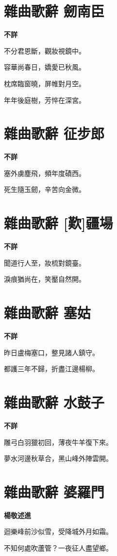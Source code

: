 \documentclass[12pt,a4paper]{ctexbook}
\begin{document}
\section{雜曲歌辭 劒南臣}
\textbf{不詳}\par\vspace{0.5em}
不分君恩斷，觀妝視鏡中。\par
容華尚春日，嬌愛已秋風。\par
枕席臨窗曉，屏帷對月空。\par
年年後庭樹，芳悴在深宮。\par

\section{雜曲歌辭 征步郎}
\textbf{不詳}\par\vspace{0.5em}
塞外虜塵飛，頻年度磧西。\par
死生隨玉劒，辛苦向金微。\par

\section{雜曲歌辭 [歎]疆場}
\textbf{不詳}\par\vspace{0.5em}
聞道行人至，妝梳對鏡臺。\par
淚痕猶尚在，笑靨自然開。\par

\section{雜曲歌辭 塞姑}
\textbf{不詳}\par\vspace{0.5em}
昨日盧梅塞口，整見諸人鎮守。\par
都護三年不歸，折盡江邊楊柳。\par

\section{雜曲歌辭 水鼓子}
\textbf{不詳}\par\vspace{0.5em}
雕弓白羽獵初回，薄夜牛羊復下來。\par
夢水河邊秋草合，黑山峰外陣雲開。\par

\section{雜曲歌辭 婆羅門}
\textbf{楊敬述進}\par\vspace{0.5em}
迴樂峰前沙似雪，受降城外月如霜。\par
不知何處吹蘆管？一夜征人盡望鄉。\par
\end{document}
